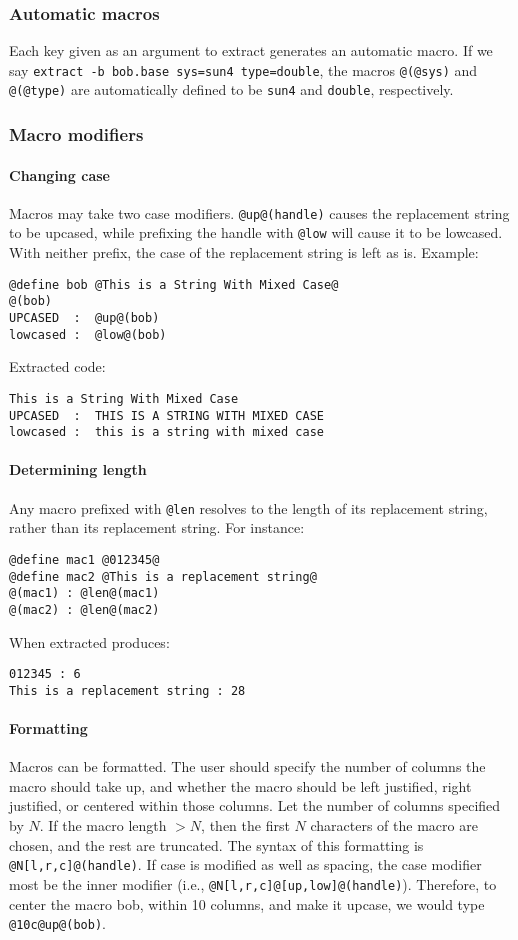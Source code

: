 \subsubsection{Automatic macros}
Each key given as an argument to extract generates an automatic macro.
If we say {\tt extract -b bob.base sys=sun4 type=double}, the macros
{\tt @(@sys)} and {\tt @(@type)} are automatically defined to be {\tt sun4}
and {\tt double}, respectively.

\subsubsection{Macro modifiers}

\paragraph{Changing case}
Macros may take two case modifiers.
{\tt @up@(handle)} causes the replacement string to be upcased, while prefixing
the handle with {\tt @low} will cause it to be lowcased.  With neither prefix,
the case of the replacement string is left as is.  Example:
\begin{verbatim}
@define bob @This is a String With Mixed Case@
@(bob)
UPCASED  :  @up@(bob)
lowcased :  @low@(bob)
\end{verbatim}
Extracted code:
\begin{verbatim}
This is a String With Mixed Case
UPCASED  :  THIS IS A STRING WITH MIXED CASE
lowcased :  this is a string with mixed case
\end{verbatim}

\paragraph{Determining length}
Any macro prefixed with {\tt @len} resolves to the length of its replacement
string, rather than its replacement string.  For instance:
\begin{verbatim}
@define mac1 @012345@
@define mac2 @This is a replacement string@
@(mac1) : @len@(mac1)
@(mac2) : @len@(mac2)
\end{verbatim}

When extracted produces:
\begin{verbatim}
012345 : 6
This is a replacement string : 28
\end{verbatim}

\paragraph{Formatting}
Macros can be formatted.  The user should specify the number of columns
the macro should take up, and whether the macro should be left justified,
right justified, or centered within those columns.  Let the number of
columns specified by $N$.  If the macro length $ > N$, then the first $N$
characters of the macro are chosen, and the rest are truncated.  The syntax
of this formatting is {\tt @N[l,r,c]@(handle)}.  If case is modified as
well as spacing, the case modifier most be the inner modifier (i.e.,
{\tt @N[l,r,c]@[up,low]@(handle)}).  Therefore, to center the macro bob, within
10 columns, and make it upcase, we would type {\tt @10c@up@(bob)}.

